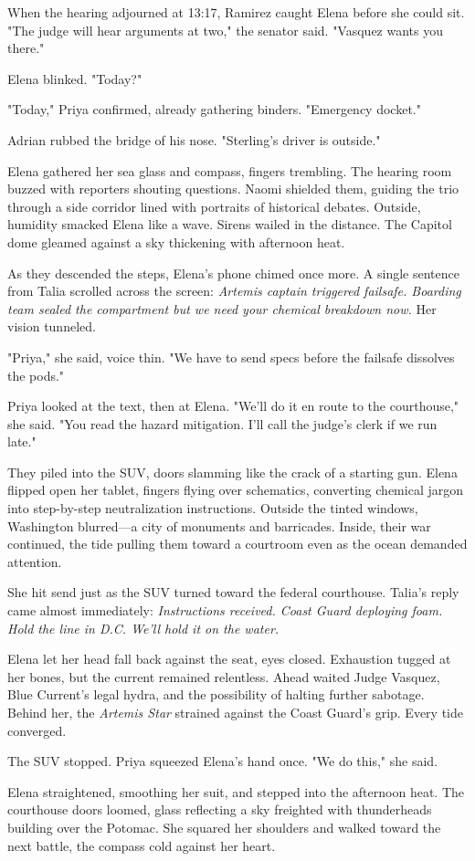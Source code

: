 When the hearing adjourned at 13:17, Ramirez caught Elena before she could sit. "The judge will hear arguments at two," the senator said. "Vasquez wants you there."

Elena blinked. "Today?"

"Today," Priya confirmed, already gathering binders. "Emergency docket."

Adrian rubbed the bridge of his nose. "Sterling's driver is outside."

Elena gathered her sea glass and compass, fingers trembling. The hearing room buzzed with reporters shouting questions. Naomi shielded them, guiding the trio through a side corridor lined with portraits of historical debates. Outside, humidity smacked Elena like a wave. Sirens wailed in the distance. The Capitol dome gleamed against a sky thickening with afternoon heat.

As they descended the steps, Elena's phone chimed once more. A single sentence from Talia scrolled across the screen: \textit{Artemis captain triggered failsafe. Boarding team sealed the compartment but we need your chemical breakdown now.} Her vision tunneled.

"Priya," she said, voice thin. "We have to send specs before the failsafe dissolves the pods."

Priya looked at the text, then at Elena. "We'll do it en route to the courthouse," she said. "You read the hazard mitigation. I'll call the judge's clerk if we run late."

They piled into the SUV, doors slamming like the crack of a starting gun. Elena flipped open her tablet, fingers flying over schematics, converting chemical jargon into step-by-step neutralization instructions. Outside the tinted windows, Washington blurred—a city of monuments and barricades. Inside, their war continued, the tide pulling them toward a courtroom even as the ocean demanded attention.

She hit send just as the SUV turned toward the federal courthouse. Talia's reply came almost immediately: \textit{Instructions received. Coast Guard deploying foam. Hold the line in D.C. We'll hold it on the water.}

Elena let her head fall back against the seat, eyes closed. Exhaustion tugged at her bones, but the current remained relentless. Ahead waited Judge Vasquez, Blue Current's legal hydra, and the possibility of halting further sabotage. Behind her, the \textit{Artemis Star} strained against the Coast Guard's grip. Every tide converged.

The SUV stopped. Priya squeezed Elena's hand once. "We do this," she said.

Elena straightened, smoothing her suit, and stepped into the afternoon heat. The courthouse doors loomed, glass reflecting a sky freighted with thunderheads building over the Potomac. She squared her shoulders and walked toward the next battle, the compass cold against her heart.
